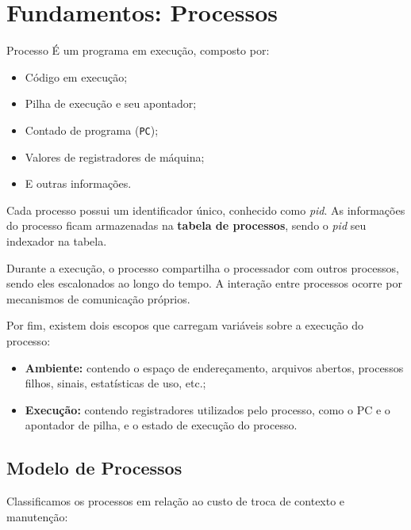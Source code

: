 \chapter{Fundamentos: Processos}

\begin{definicao}{Processo}
  É um programa em execução, composto por:
  \begin{itemize}
    \item Código em execução;
    \item Pilha de execução e seu apontador;
    \item Contado de programa (\texttt{PC});
    \item Valores de registradores de máquina;
    \item E outras informações.
  \end{itemize}
\end{definicao}

Cada processo possui um identificador único, conhecido como \textit{pid}. As informações do processo ficam armazenadas na \textbf{tabela de processos}, sendo o \textit{pid} seu indexador na tabela.

Durante a execução, o processo compartilha o processador com outros processos, sendo eles escalonados ao longo do tempo. A interação entre processos ocorre por mecanismos de comunicação próprios.

Por fim, existem dois escopos que carregam variáveis sobre a execução do processo:

\begin{itemize}
  \item \textbf{Ambiente:} contendo o espaço de endereçamento, arquivos abertos, processos filhos, sinais, estatísticas de uso, etc.;

  \item \textbf{Execução:} contendo registradores utilizados pelo processo, como o PC e o apontador de pilha, e o estado de execução do processo.
\end{itemize}


















\section{Modelo de Processos}
Classificamos os processos em relação ao custo de troca de contexto e manutenção:


